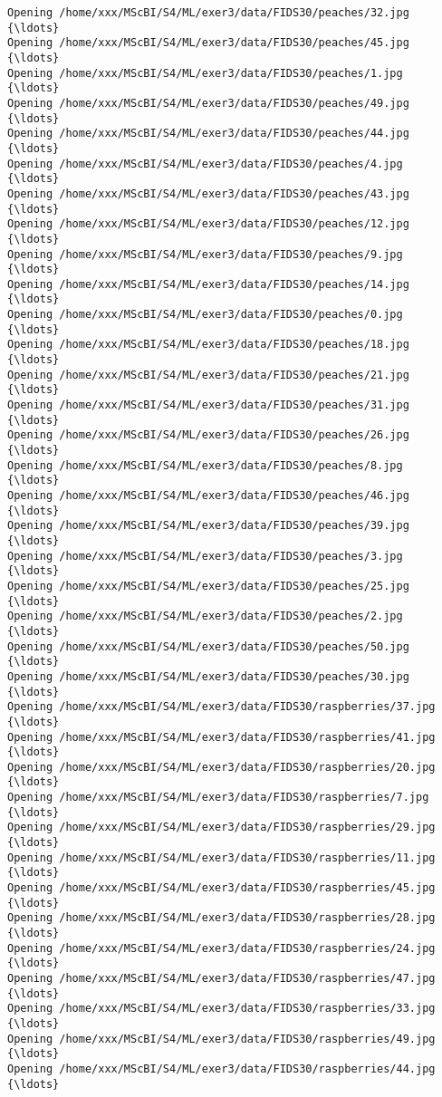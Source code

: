 \documentclass[11pt]{article}
\begin{document}
\begin{Verbatim}[commandchars=\\\{\}]
Opening /home/xxx/MScBI/S4/ML/exer3/data/FIDS30/peaches/32.jpg  {\ldots}
Opening /home/xxx/MScBI/S4/ML/exer3/data/FIDS30/peaches/45.jpg  {\ldots}
Opening /home/xxx/MScBI/S4/ML/exer3/data/FIDS30/peaches/1.jpg  {\ldots}
Opening /home/xxx/MScBI/S4/ML/exer3/data/FIDS30/peaches/49.jpg  {\ldots}
Opening /home/xxx/MScBI/S4/ML/exer3/data/FIDS30/peaches/44.jpg  {\ldots}
Opening /home/xxx/MScBI/S4/ML/exer3/data/FIDS30/peaches/4.jpg  {\ldots}
Opening /home/xxx/MScBI/S4/ML/exer3/data/FIDS30/peaches/43.jpg  {\ldots}
Opening /home/xxx/MScBI/S4/ML/exer3/data/FIDS30/peaches/12.jpg  {\ldots}
Opening /home/xxx/MScBI/S4/ML/exer3/data/FIDS30/peaches/9.jpg  {\ldots}
Opening /home/xxx/MScBI/S4/ML/exer3/data/FIDS30/peaches/14.jpg  {\ldots}
Opening /home/xxx/MScBI/S4/ML/exer3/data/FIDS30/peaches/0.jpg  {\ldots}
Opening /home/xxx/MScBI/S4/ML/exer3/data/FIDS30/peaches/18.jpg  {\ldots}
Opening /home/xxx/MScBI/S4/ML/exer3/data/FIDS30/peaches/21.jpg  {\ldots}
Opening /home/xxx/MScBI/S4/ML/exer3/data/FIDS30/peaches/31.jpg  {\ldots}
Opening /home/xxx/MScBI/S4/ML/exer3/data/FIDS30/peaches/26.jpg  {\ldots}
Opening /home/xxx/MScBI/S4/ML/exer3/data/FIDS30/peaches/8.jpg  {\ldots}
Opening /home/xxx/MScBI/S4/ML/exer3/data/FIDS30/peaches/46.jpg  {\ldots}
Opening /home/xxx/MScBI/S4/ML/exer3/data/FIDS30/peaches/39.jpg  {\ldots}
Opening /home/xxx/MScBI/S4/ML/exer3/data/FIDS30/peaches/3.jpg  {\ldots}
Opening /home/xxx/MScBI/S4/ML/exer3/data/FIDS30/peaches/25.jpg  {\ldots}
Opening /home/xxx/MScBI/S4/ML/exer3/data/FIDS30/peaches/2.jpg  {\ldots}
Opening /home/xxx/MScBI/S4/ML/exer3/data/FIDS30/peaches/50.jpg  {\ldots}
Opening /home/xxx/MScBI/S4/ML/exer3/data/FIDS30/peaches/30.jpg  {\ldots}
Opening /home/xxx/MScBI/S4/ML/exer3/data/FIDS30/raspberries/37.jpg  {\ldots}
Opening /home/xxx/MScBI/S4/ML/exer3/data/FIDS30/raspberries/41.jpg  {\ldots}
Opening /home/xxx/MScBI/S4/ML/exer3/data/FIDS30/raspberries/20.jpg  {\ldots}
Opening /home/xxx/MScBI/S4/ML/exer3/data/FIDS30/raspberries/7.jpg  {\ldots}
Opening /home/xxx/MScBI/S4/ML/exer3/data/FIDS30/raspberries/29.jpg  {\ldots}
Opening /home/xxx/MScBI/S4/ML/exer3/data/FIDS30/raspberries/11.jpg  {\ldots}
Opening /home/xxx/MScBI/S4/ML/exer3/data/FIDS30/raspberries/45.jpg  {\ldots}
Opening /home/xxx/MScBI/S4/ML/exer3/data/FIDS30/raspberries/28.jpg  {\ldots}
Opening /home/xxx/MScBI/S4/ML/exer3/data/FIDS30/raspberries/24.jpg  {\ldots}
Opening /home/xxx/MScBI/S4/ML/exer3/data/FIDS30/raspberries/47.jpg  {\ldots}
Opening /home/xxx/MScBI/S4/ML/exer3/data/FIDS30/raspberries/33.jpg  {\ldots}
Opening /home/xxx/MScBI/S4/ML/exer3/data/FIDS30/raspberries/49.jpg  {\ldots}
Opening /home/xxx/MScBI/S4/ML/exer3/data/FIDS30/raspberries/44.jpg  {\ldots}

\end{Verbatim}
\end{document}
